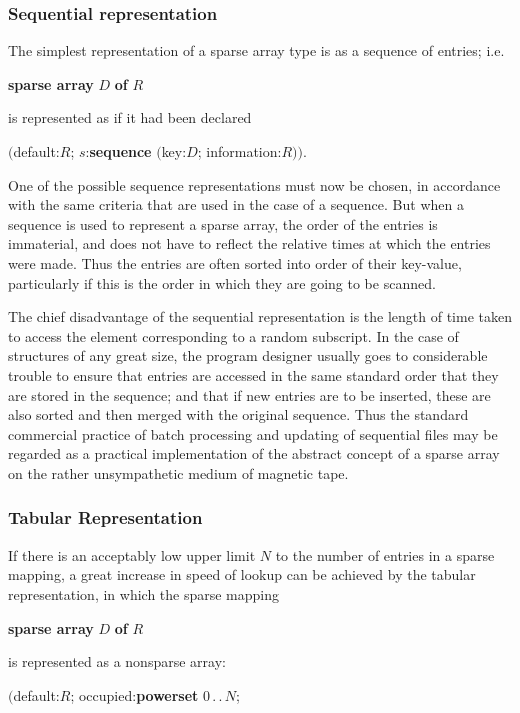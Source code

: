 \documentclass[twoside,11pt]{book}
\begin{document}
\subsubsection{Sequential representation}

The simplest representation of a sparse array type is as a sequence of entries;
i.e.

\quad \textbf{sparse array} $D$ \textbf{of} $R$

\noindent
is represented as if it had been declared

\quad $($default:$R$; $s$:\textbf{sequence} $($key:$D$; information:$R))$.

One of the possible sequence representations must now be chosen, in accordance with the same criteria that are used in the case of a sequence. But when a sequence is used to represent a sparse array, the order of the entries is immaterial, and does not have to reflect the relative times at which the entries were made. Thus the entries are often sorted into order of their
key-value, particularly if this is the order in which they are going to be scanned.

The chief disadvantage of the sequential representation is the length of time taken to access the element corresponding to a random subscript. In the case of structures of any great size, the program designer usually goes to considerable trouble to ensure that entries are accessed in the same standard order that they are stored in the sequence; and that if new entries are to be inserted, these are also sorted and then merged with the original sequence. Thus the standard commercial practice of batch processing and updating of sequential files may be regarded as a practical implementation of the abstract concept of a sparse array on the rather unsympathetic medium of magnetic tape.

\subsubsection{Tabular Representation}

If there is an acceptably low upper limit $N$ to the number of entries in a sparse mapping, a great increase in speed of lookup can be achieved by the tabular representation, in which the sparse mapping

\quad \textbf{sparse array} $D$ \textbf{of} $R$

\noindent
is represented as a nonsparse array:

\quad $($default:$R$; occupied:\textbf{powerset} $0\,.\,.\,N$;
\end{document}
